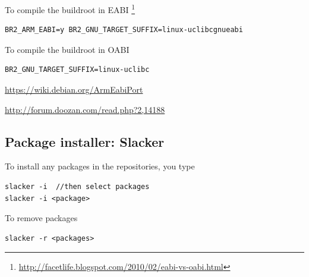 To compile the buildroot in EABI
\footnote{\url{http://facetlife.blogspot.com/2010/02/eabi-vs-oabi.html}}
\begin{verbatim}
BR2_ARM_EABI=y BR2_GNU_TARGET_SUFFIX=linux-uclibcgnueabi
\end{verbatim}
To compile the buildroot in OABI
\begin{verbatim}
BR2_GNU_TARGET_SUFFIX=linux-uclibc
\end{verbatim}
\url{https://wiki.debian.org/ArmEabiPort}

\url{http://forum.doozan.com/read.php?2,14188}


% 
% 
% 

\subsection{Package installer: Slacker}
\label{sec:slacker}

To install any packages in the repositories, you type
\begin{verbatim}
slacker -i  //then select packages
slacker -i <package>
\end{verbatim}

To remove packages
\begin{verbatim}
slacker -r <packages>
\end{verbatim}


